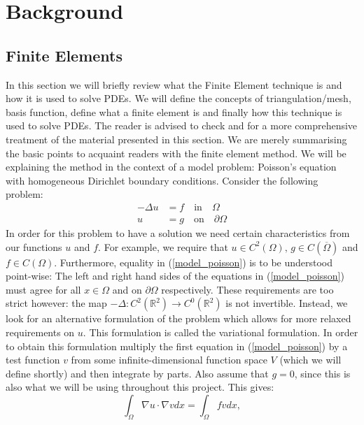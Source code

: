 \documentclass[12pt,a4paper]{article}
\theoremstyle{definition}
\begin{document}
\section{Background}\label{literature_review}
\subsection{Finite Elements}
In this section we will briefly review what the Finite Element technique is and how it is used to solve PDEs.  We will define the concepts of triangulation/mesh, basis function, define what a finite element is and finally how this technique is used to solve PDEs.  The reader is advised to check \cite{logg2012automated} and \cite{brenner2007mathematical} for a more comprehensive treatment of the material presented in this section.  We are merely summarising the basic points to acquaint readers with the finite element method.   We will be explaining the method in the context of a model problem: Poisson's equation with homogeneous Dirichlet boundary conditions.  Consider the following problem:
\begin{equation}\label{model_poisson}
\begin{aligned}
-\Delta u &= f \quad \text{in}\quad \Omega\\
u &= g \quad \text{on}\quad \partial \Omega
\end{aligned}
\end{equation}
In order for this problem to have a solution we need certain characteristics from our functions $u$ and $f$.  For example, we require that $u\in C^2\left(\Omega\right) ,\,g\in C\left(\overline{\Omega}\right)$ and $f \in C\left(\Omega\right)$.  Furthermore, equality in (\ref{model_poisson}) is to be understood point-wise:  The left and right hand sides of the equations in (\ref{model_poisson}) must agree for all $x \in \Omega$ and on $\partial\Omega$ respectively. These requirements are too strict however:  the map $-\Delta : C^2\left(\mathbb{R}^2\right)\rightarrow C^0\left(\mathbb{R}^2\right)$ is not invertible.  Instead, we look for an alternative formulation of the problem which allows for more relaxed requirements on $u$.  This formulation is called the variational formulation.   In order to obtain this formulation multiply the first equation in (\ref{model_poisson}) by a test function $v$ from some infinite-dimensional function space $V$ (which we will define shortly) and then integrate by parts.  Also assume that $g=0$, since this is also what we will be using throughout this project.  This gives:
\begin{equation}
\int_{\Omega}\nabla u \cdot \nabla v dx =\int_{\Omega}fvdx,
\end{equation}
\end{document}
